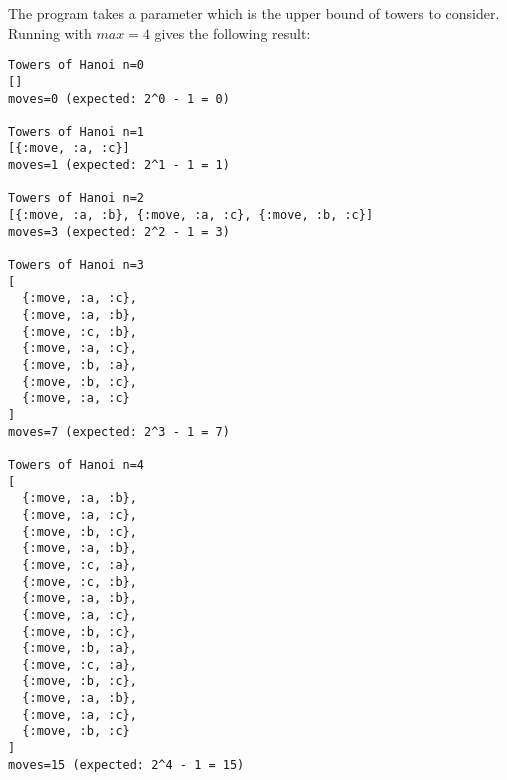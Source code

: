 \documentclass[a4paper,11pt]{article}
\begin{document}
The program takes a parameter which is the upper bound of towers to consider. Running with $max=4$ gives the following result:
\begin{verbatim}
Towers of Hanoi n=0
[]
moves=0 (expected: 2^0 - 1 = 0)

Towers of Hanoi n=1
[{:move, :a, :c}]
moves=1 (expected: 2^1 - 1 = 1)

Towers of Hanoi n=2
[{:move, :a, :b}, {:move, :a, :c}, {:move, :b, :c}]
moves=3 (expected: 2^2 - 1 = 3)

Towers of Hanoi n=3
[
  {:move, :a, :c},
  {:move, :a, :b},
  {:move, :c, :b},
  {:move, :a, :c},
  {:move, :b, :a},
  {:move, :b, :c},
  {:move, :a, :c}
]
moves=7 (expected: 2^3 - 1 = 7)

Towers of Hanoi n=4
[
  {:move, :a, :b},
  {:move, :a, :c},
  {:move, :b, :c},
  {:move, :a, :b},
  {:move, :c, :a},
  {:move, :c, :b},
  {:move, :a, :b},
  {:move, :a, :c},
  {:move, :b, :c},
  {:move, :b, :a},
  {:move, :c, :a},
  {:move, :b, :c},
  {:move, :a, :b},
  {:move, :a, :c},
  {:move, :b, :c}
]
moves=15 (expected: 2^4 - 1 = 15)
\end{verbatim}
\end{document}
